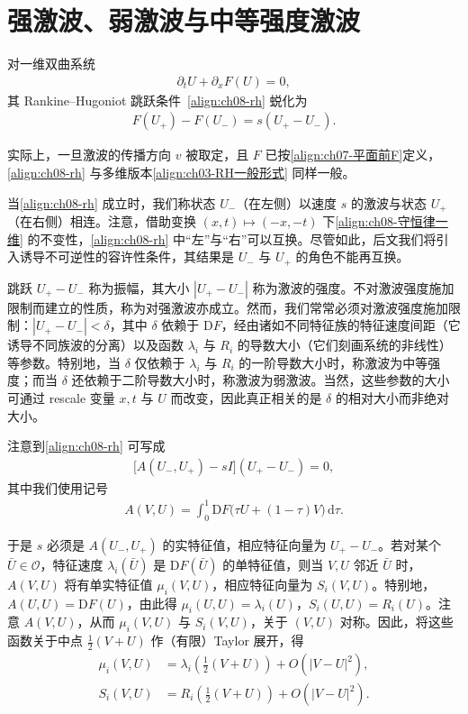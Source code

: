 \documentclass[../../main.tex]{subfiles}
\begin{document}
\section{强激波、弱激波与中等强度激波}\label{section:ch08-强激波弱激波中等强度激波}

对一维双曲系统
\begin{align}
\partial_t U+\partial_x F(U)=0,
\label{align:ch08-守恒律一维}
\end{align}
其 Rankine--Hugoniot 跳跃条件~\eqref{align:ch08-rh} 蜕化为
\begin{align}
F(U_+)-F(U_-)=s(U_+-U_-).
\label{align:ch08-rh}
\end{align}

实际上，一旦激波的传播方向 $v$ 被取定，且 $F$ 已按\eqref{align:ch07-平面前F}定义，\eqref{align:ch08-rh} 与多维版本\eqref{align:ch03-RH一般形式} 同样一般。

当\eqref{align:ch08-rh} 成立时，我们称状态 $U_-$（在左侧）以速度 $s$ 的激波与状态 $U_+$（在右侧）相连。注意，借助变换 $(x,t)\mapsto(-x,-t)$ 下\eqref{align:ch08-守恒律一维} 的不变性，\eqref{align:ch08-rh} 中“左”与“右”可以互换。尽管如此，后文我们将引入诱导不可逆性的容许性条件，其结果是 $U_-$ 与 $U_+$ 的角色不能再互换。

跳跃 $U_+-U_-$ 称为振幅，其大小 $|U_+-U_-|$ 称为激波的强度。不对激波强度施加限制而建立的性质，称为对强激波亦成立。然而，我们常常必须对激波强度施加限制：$|U_+-U_-|<\delta$，其中 $\delta$ 依赖于 $\mathrm{D}F$，经由诸如不同特征族的特征速度间距（它诱导不同族波的分离）以及函数 $\lambda_i$ 与 $R_i$ 的导数大小（它们刻画系统的非线性）等参数。特别地，当 $\delta$ 仅依赖于 $\lambda_i$ 与 $R_i$ 的一阶导数大小时，称激波为中等强度；而当 $\delta$ 还依赖于二阶导数大小时，称激波为弱激波。当然，这些参数的大小可通过 rescale 变量 $x,t$ 与 $U$ 而改变，因此真正相关的是 $\delta$ 的相对大小而非绝对大小。

注意到\eqref{align:ch08-rh} 可写成
\begin{align}
\big[A(U_-,U_+)-sI\big](U_+-U_-)=0,
\label{align:ch08-rh平均}
\end{align}
其中我们使用记号
\begin{align}
A(V,U)=\int_0^1 \mathrm{D}F\big(\tau U+(1-\tau)V\big)\,\mathrm{d}\tau.
\label{align:ch08-平均jacobi}
\end{align}

于是 $s$ 必须是 $A(U_-,U_+)$ 的实特征值，相应特征向量为 $U_+-U_-$。若对某个 $\bar U\in\mathcal O$，特征速度 $\lambda_i(\bar U)$ 是 $\mathrm{D}F(\bar U)$ 的单特征值，则当 $V,U$ 邻近 $\bar U$ 时，$A(V,U)$ 将有单实特征值 $\mu_i(V,U)$，相应特征向量为 $S_i(V,U)$。特别地，$A(U,U)=\mathrm{D}F(U)$，由此得 $\mu_i(U,U)=\lambda_i(U)$，$S_i(U,U)=R_i(U)$。注意 $A(V,U)$，从而 $\mu_i(V,U)$ 与 $S_i(V,U)$，关于 $(V,U)$ 对称。因此，将这些函数关于中点 $\frac12(V+U)$ 作（有限）Taylor 展开，得
\begin{align}
\mu_i(V,U)&=\lambda_i\!\left(\tfrac12(V+U)\right)+O(|V-U|^2),
\label{align:ch08-mu展开}\\
S_i(V,U)&=R_i\!\left(\tfrac12(V+U)\right)+O(|V-U|^2).
\label{align:ch08-S展开}
\end{align}
\end{document}
